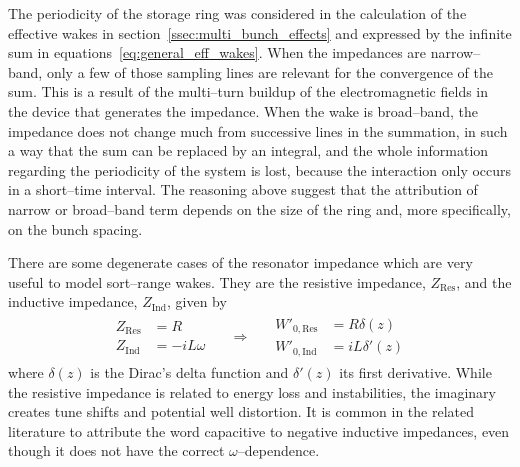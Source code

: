     The periodicity of the storage ring was considered in the calculation of the effective wakes in section~\ref{ssec:multi_bunch_effects} and expressed by the infinite sum in equations~\eqref{eq:general_eff_wakes}. When the impedances are narrow--band, only a few of those sampling lines are relevant for the convergence of the sum. This is a result of the multi--turn buildup of the electromagnetic fields in the device that generates the impedance. When the wake is broad--band, the impedance does not change much from successive lines in the summation, in such a way that the sum can be replaced by an integral, and the whole information regarding the periodicity of the system is lost, because the interaction only occurs in a short--time interval. The reasoning above suggest that the attribution of narrow or broad--band term depends on the size of the ring and, more specifically, on the bunch spacing.

    There are some degenerate cases of the resonator impedance which are very useful to model sort--range wakes. They are the resistive impedance, $Z_\text{Res}$, and the inductive impedance, $Z_\text{Ind}$, given by
    \begin{align}
        \begin{aligned}
            Z_\text{Res} &= R \\
            Z_\text{Ind} &= -iL\omega
        \end{aligned}
        && \Rightarrow &&
        \begin{aligned}
            W'_{0,\text{Res}} &= R\delta(z) \\
            W'_{0,\text{Ind}} &= iL\delta'(z)
        \end{aligned}
    \end{align}
    where $\delta(z)$ is the Dirac's delta function and $\delta'(z)$ its first derivative. While the resistive impedance is related to energy loss and instabilities, the imaginary creates tune shifts and potential well distortion. It is common in the related literature to attribute the word capacitive to negative inductive impedances, even though it does not have the correct $\omega$--dependence.

